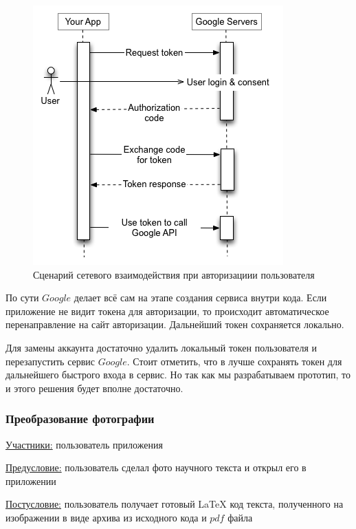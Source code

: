 \begin{figure}
    \includegraphics[scale=0.5]{img/use_cases/authorization.png}
    \caption{Сценарий сетевого взаимодействия при авторизациии пользователя}
    \label{auth}
\end{figure}

По сути $Google$ делает всё сам на этапе создания сервиса внутри кода. Если приложение не видит токена для авторизации, то происходит автоматическое перенаправление на сайт авторизации. Дальнейший токен сохраняется локально.

Для замены аккаунта достаточно удалить локальный токен пользователя и перезапустить сервис $Google$. Стоит отметить, что в лучше сохранять токен для дальнейшего быстрого входа в сервис. Но так как мы разрабатываем прототип, то и этого решения будет вполне достаточно.

\subsubsection{Преобразование фотографии}
\underline{Участники:} пользователь приложения

\underline{Предусловие:} пользователь сделал фото научного текста и открыл его в приложении

\underline{Постусловие:} пользователь получает готовый \LaTeX\; код текста, полученного на изображении в виде архива из исходного кода и $pdf$ файла

